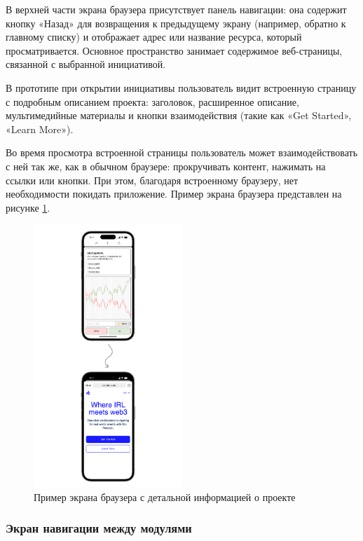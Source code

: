 \documentclass[
    candidate, %
    subf, %
    dotsinheaders=false,
]{disser}
\begin{document}
В верхней части экрана браузера присутствует панель навигации: она содержит кнопку «Назад» для возвращения к предыдущему экрану (например, обратно к главному списку) и отображает адрес или название ресурса, который просматривается. Основное пространство занимает содержимое веб-страницы, связанной с выбранной инициативой.

В прототипе при открытии инициативы пользователь видит встроенную страницу с подробным описанием проекта: заголовок, расширенное описание, мультимедийные материалы и кнопки взаимодействия (такие как «Get Started», «Learn More»).

Во время просмотра встроенной страницы пользователь может взаимодействовать с ней так же, как в обычном браузере: прокручивать контент, нажимать на ссылки или кнопки. При этом, благодаря встроенному браузеру, нет необходимости покидать приложение. Пример экрана браузера представлен на рисунке \ref{fig:app-browser}.

\begin{figure}[h]
  \centering
  \includegraphics[width=0.5\textwidth]{./assets/app-browser.png}
  \caption{Пример экрана браузера с детальной информацией о проекте}
  \label{fig:app-browser}
\end{figure}


\subsubsection{Экран навигации между модулями}
\end{document}
